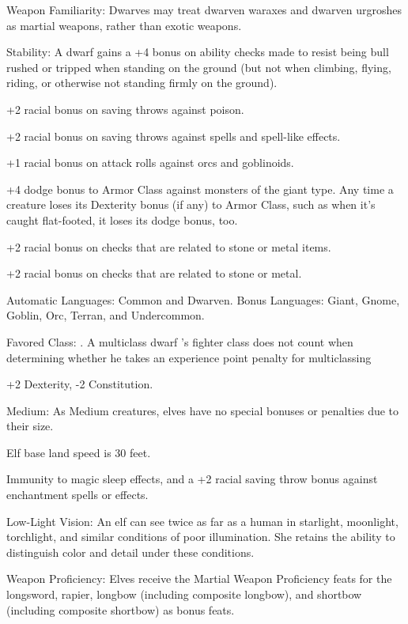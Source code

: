 Weapon Familiarity: Dwarves may treat dwarven waraxes and dwarven urgroshes as 
martial weapons, rather than exotic weapons.

Stability: A dwarf gains a +4 bonus on ability checks made to resist being bull 
rushed or tripped when standing on the ground (but not when climbing, flying, riding, 
or otherwise not standing firmly on the ground).

+2 racial bonus on saving throws against poison.

+2 racial bonus on saving throws against spells and spell-like effects.

+1 racial bonus on attack rolls against orcs and goblinoids.

+4 dodge bonus to Armor Class against monsters of the giant type. Any time a creature 
loses its Dexterity bonus (if any) to Armor Class, such as when it's caught flat-footed, 
it loses its dodge bonus, too. 

+2 racial bonus on  checks that are related to stone or metal items.

+2 racial bonus on  checks that are related to stone or metal.

Automatic Languages: Common and Dwarven. Bonus Languages: Giant, Gnome, Goblin, 
Orc, Terran, and Undercommon.

Favored Class: . A multiclass dwarf 's fighter class does not count when 
determining whether he takes an experience point penalty for multiclassing


+2 Dexterity, -2 Constitution.

Medium: As Medium creatures, elves have no special bonuses or penalties due to 
their size.

Elf base land speed is 30 feet.

Immunity to magic sleep effects, and a +2 racial saving throw bonus against enchantment 
spells or effects.

Low-Light Vision: An elf can see twice as far as a human in starlight, moonlight, 
torchlight, and similar conditions of poor illumination. She retains the ability 
to distinguish color and detail under these conditions.

Weapon Proficiency: Elves receive the Martial Weapon Proficiency feats for the 
longsword, rapier, longbow (including composite longbow), and shortbow (including 
composite shortbow) as bonus feats.

